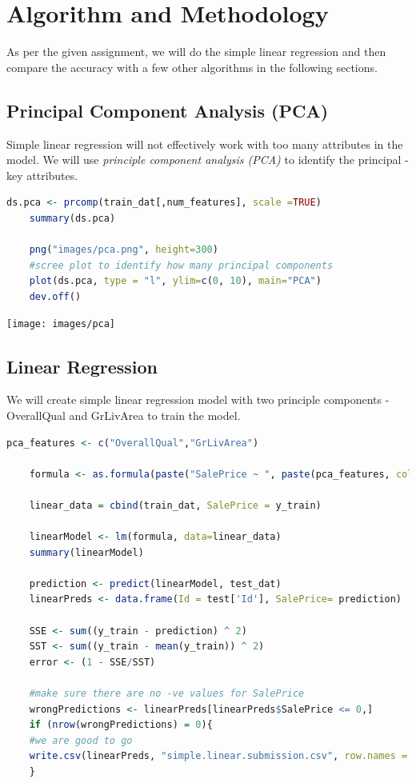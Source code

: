 \documentclass[sigconf]{acmart}
\begin{document}
	
	
	\section{Algorithm and Methodology}

	As per the given assignment, we will do the simple linear regression and then compare the accuracy with a few other algorithms in the following sections.
	
	\subsection{Principal Component Analysis (PCA)}
	
	Simple linear regression will not effectively work with too many attributes in the model. We will use {\em principle component analysis (PCA)} to identify the principal - key attributes.
	
	\begin{lstlisting}[language=R]
	ds.pca <- prcomp(train_dat[,num_features], scale =TRUE)
	summary(ds.pca)
	
	png("images/pca.png", height=300)
	#scree plot to identify how many principal components
	plot(ds.pca, type = "l", ylim=c(0, 10), main="PCA")
	dev.off()
	\end{lstlisting}
	
	\begin{center}		
		\texttt{[image: images/pca]}	
	\end{center}
	
	\subsection{Linear Regression}
		
	We will create simple linear regression model with two principle components - OverallQual and GrLivArea to train the model.
	
	\begin{lstlisting}[language=R]
	pca_features <- c("OverallQual","GrLivArea")
	
	formula <- as.formula(paste("SalePrice ~ ", paste(pca_features, collapse="+")))
	
	linear_data = cbind(train_dat, SalePrice = y_train)
	
	linearModel <- lm(formula, data=linear_data)
	summary(linearModel)
	
	prediction <- predict(linearModel, test_dat)
	linearPreds <- data.frame(Id = test['Id'], SalePrice= prediction)
	
	SSE <- sum((y_train - prediction) ^ 2)
	SST <- sum((y_train - mean(y_train)) ^ 2)
	error <- (1 - SSE/SST)
	
	#make sure there are no -ve values for SalePrice
	wrongPredictions <- linearPreds[linearPreds$SalePrice <= 0,]
	if (nrow(wrongPredictions) = 0){
	#we are good to go
	write.csv(linearPreds, "simple.linear.submission.csv", row.names = F)
	}
	
	\end{lstlisting}
	
\end{document}
